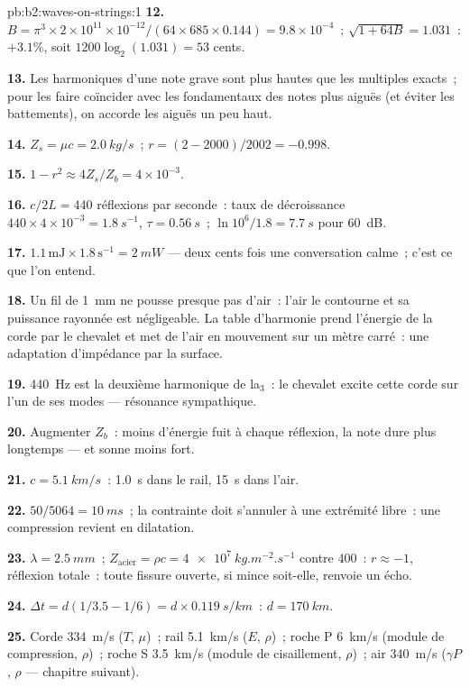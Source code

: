 \begin{solution}{pb:b2:waves-on-strings:1}
\textbf{12.} $B = \pi^3 \times 2 \times 10^{11} \times 10^{-12}/(64 \times 685 \times 0.144) =
9.8 \times 10^{-4}$~; $\sqrt{1 + 64B} = 1.031$~: $+3.1\%$, soit $1200\log_2(1.031) = 53$ cents.

\textbf{13.} Les harmoniques d'une note grave sont plus hautes que les multiples
exacts~; pour les faire coïncider avec les fondamentaux des notes plus
aiguës (et éviter les battements), on accorde les aiguës un peu haut.

\textbf{14.} $Z_s = \mu c = \qty{2.0}{kg/s}$~; $r = (2 - 2000)/2002 = -0.998$.

\textbf{15.} $1 - r^2 \approx 4Z_s/Z_b = 4 \times 10^{-3}$.

\textbf{16.} $c/2L = 440$ réflexions par seconde~: taux de décroissance $440 \times 4 \times
10^{-3} = \qty{1.8}{s^{-1}}$, $\tau = \qty{0.56}{s}$~; $\ln10^6/1.8 = \qty{7.7}{s}$ pour
\qty{60}{dB}.

\textbf{17.} $1.1\,\text{mJ} \times 1.8\,\text{s}^{-1} = \qty{2}{mW}$ --- deux cents
fois une conversation calme~; c'est ce que l'on entend.

\textbf{18.} Un fil de \qty{1}{mm} ne pousse presque pas d'air~: l'air le
contourne et sa puissance rayonnée est négligeable. La table d'harmonie prend
l'énergie de la corde par le chevalet et met de l'air en mouvement sur un mètre carré~:
une adaptation d'impédance par la surface.

\textbf{19.} \qty{440}{Hz} est la deuxième harmonique de la$_3$~: le chevalet excite
cette corde sur l'un de ses modes --- résonance sympathique.

\textbf{20.} Augmenter $Z_b$~: moins d'énergie fuit à chaque réflexion, la note dure
plus longtemps --- et sonne moins fort.

\textbf{21.} $c = \qty{5.1}{km/s}$~: \qty{1.0}{s} dans le rail, \qty{15}{s} dans l'air.

\textbf{22.} $50/5064 = \qty{10}{ms}$~; la contrainte doit s'annuler à une extrémité libre~:
une compression revient en dilatation.

\textbf{23.} $\lambda = \qty{2.5}{mm}$~; $Z_{\text{acier}} = \rho c = \qty{4e7}{kg.m^{-2}.s^{-1}}$
contre $400$~: $r \approx -1$, réflexion totale~: toute fissure ouverte, si
mince soit-elle, renvoie un écho.

\textbf{24.} $\Delta t = d(1/3.5 - 1/6) = d \times \qty{0.119}{s/km}$~: $d = \qty{170}{km}$.

\textbf{25.} Corde \qty{334}{m/s} ($T$, $\mu$)~; rail \qty{5.1}{km/s} ($E$, $\rho$)~;
roche P \qty{6}{km/s} (module de compression, $\rho$)~; roche S \qty{3.5}{km/s}
(module de cisaillement, $\rho$)~; air \qty{340}{m/s} ($\gamma P$, $\rho$ --- chapitre suivant).
\end{solution}
